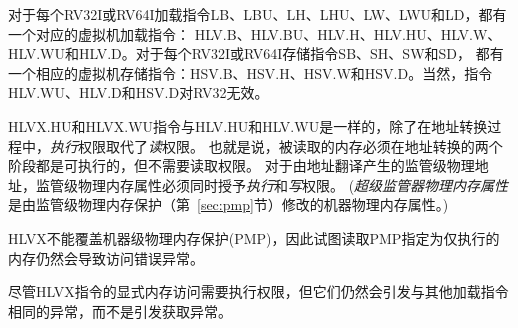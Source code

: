 对于每个RV32I或RV64I加载指令LB、LBU、LH、LHU、LW、LWU和LD，都有一个对应的虚拟机加载指令：
HLV.B、HLV.BU、HLV.H、HLV.HU、HLV.W、HLV.WU和HLV.D。对于每个RV32I或RV64I存储指令SB、SH、SW和SD，
都有一个相应的虚拟机存储指令：HSV.B、HSV.H、HSV.W和HSV.D。当然，指令HLV.WU、HLV.D和HSV.D对RV32无效。

HLVX.HU和HLVX.WU指令与HLV.HU和HLV.WU是一样的，除了在地址转换过程中，\textit{执行}权限取代了\textit{读}权限。
也就是说，被读取的内存必须在地址转换的两个阶段都是可执行的，但不需要读取权限。
对于由地址翻译产生的监管级物理地址，监管级物理内存属性必须同时授予\textit{执行}和\textit{写}权限。
(\textit{超级监管器物理内存属性}是由监管级物理内存保护（第~\ref{sec:pmp}节）修改的机器物理内存属性。)

\begin{commentary}
  HLVX不能覆盖机器级物理内存保护(PMP)，因此试图读取PMP指定为仅执行的内存仍然会导致访问错误异常。

尽管HLVX指令的显式内存访问需要执行权限，但它们仍然会引发与其他加载指令相同的异常，而不是引发获取异常。
\end{commentary}

